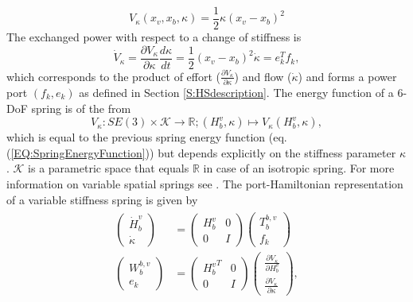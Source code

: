 \documentclass[a4paper,twoside, openright,12pt]{report}
\begin{document}
\begin{equation}
V_{\kappa}(x_v,x_b,\kappa) = \frac{1}{2} \kappa (x_v-x_b)^2
\end{equation}    
The exchanged power with respect to a change of stiffness is 
\begin{equation}
\dot{V}_{\kappa} =\frac{\partial V_{\kappa}}{\partial \kappa} \frac{d \kappa}{dt} = \frac{1}{2} (x_v-x_b)^2 \dot{\kappa} = e_k^Tf_k,
\end{equation}
which corresponds to the product of effort ($\frac{\partial V_{\kappa}}{\partial \kappa}$) and flow ($\dot{\kappa}$) and forms a power port $(f_k,e_k)$ as defined in Section \ref{S:HSdescription}. The energy function of a $6$-DoF spring is of the from
\begin{equation}
V_{\kappa}:SE(3) \times \mathcal{K} \rightarrow \mathbb{R}; (H_b^v,\kappa)\mapsto V_{\kappa}(H_b^v,\kappa),
\end{equation}
which is equal to the previous spring energy function (eq. (\ref{EQ:SpringEnergyFunction})) but depends explicitly on the stiffness parameter $\kappa$. $\mathcal{K}$ is a parametric space that equals $\mathbb{R}$ in case of an isotropic spring. For more information on variable spatial springs see \cite{Stramigioli_01c}. The port-Hamiltonian representation of a variable stiffness spring is given by
\begin{eqnarray}
\begin{aligned}
\begin{pmatrix}
\dot{H}_b^v \\ \dot{\kappa}
\end{pmatrix}
&=
\begin{pmatrix}
H_b^v & 0 \\ 0 & I
\end{pmatrix}
\begin{pmatrix}
T_b^{b,v} \\ f_k
\end{pmatrix}
\\
\begin{pmatrix}
W_b^{b,v} \\ e_k
\end{pmatrix}
&=
\begin{pmatrix}
{H_b^v}^T & 0 \\ 0 & I
\end{pmatrix}
\begin{pmatrix}
\frac{\partial V_{\kappa}}{\partial H_b^v} \\ \frac{\partial V_{\kappa}}{\partial \kappa}
\end{pmatrix},
\end{aligned}
\end{eqnarray}
\end{document}
